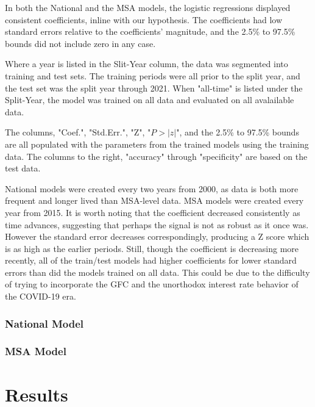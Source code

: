 In both the National and the MSA models, the logistic regressions displayed consistent coefficients, inline with our hypothesis. The coefficients had low standard errors relative  to the coefficients' magnitude, and the 2.5\% to 97.5\% bounds did not include zero in any case. 

Where a year is listed in the Slit-Year column, the data was segmented into training and test sets. The training periods were all prior to the split year, and the test set was the split year through 2021. When "all-time" is listed under the Split-Year, the model was trained on all data and evaluated on all avalailable data. 

The columns, "Coef.", "Std.Err.", "Z", "$P>|z|$", and the 2.5\% to 97.5\% bounds are all populated with the parameters from the trained models using the training data. The columns to the right, "accuracy" through "specificity" are based on the test data. 

National models were created every two years from 2000, as data is both more frequent and longer lived than MSA-level data. MSA models were created every year from 2015. It is worth noting that the coefficient decreased consistently as time advances, suggesting that perhaps the signal is not as robust as it once was. However the standard error decreases correspondingly, producing a Z score which is as high as the earlier periods. Still, though the coefficient is decreasing more recently, all of the train/test models had higher coefficients for lower standard errors than did the models trained on all data. This could be due to the difficulty of trying to incorporate the GFC and the unorthodox interest rate behavior of the COVID-19 era. 

\subsubsection{National Model}

\subsubsection{MSA Model}

\section{Results}



